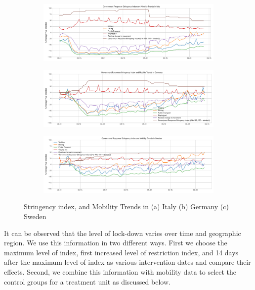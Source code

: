 \documentclass[fleqn,10pt]{wlscirep}
\begin{document}
    
\begin{figure}
	\centering
	\begin{subfigure}[b]{\textwidth}
		\centering
		\includegraphics[width=0.7\linewidth,height=0.15\textheight]{FIG2}
	\end{subfigure}
	
	\begin{subfigure}[b]{\textwidth}
		\centering
		\includegraphics[width=0.7\linewidth,height=0.15\textheight]{FIG3}
	\end{subfigure}
	
	\begin{subfigure}[b]{\textwidth}
		\centering
		\includegraphics[width=0.7\linewidth,height=0.15\textheight]{FIG4}
	\end{subfigure}

	\caption[Mobility Trends]{Stringency index, and Mobility Trends in (a) Italy (b) Germany (c) Sweden}
	\label{fig2} 
\end{figure}

    It can be observed that the level of lock-down varies over time and geographic region. We use this information in two different ways. First we choose the maximum level of index, first increased level of restriction index, and 14 days after the maximum level of index as various intervention dates and compare their effects. Second, we combine this information with mobility data to select the control groups for a treatment unit as discussed below.
    
\end{document}
